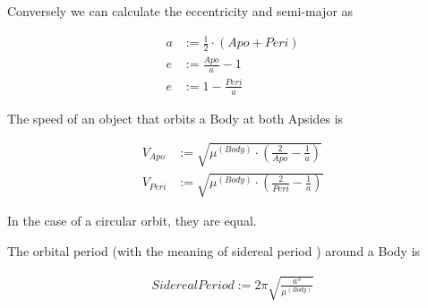 \documentclass[11pt]{article}
\begin{document}
Conversely we can calculate the eccentricity and semi-major as

\begin{align}
  a & := \frac{1}{2}\cdot(Apo + Peri)\\
  e & := \frac{Apo}{a} - 1\\
  e & := 1 - \frac{Peri}{a}
\end{align}

The speed of an object that orbits a Body at both Apsides is

\begin{align}
V_{Apo} & := \sqrt{\mu^{(Body)} \cdot \left(\frac{2}{Apo} - \frac{1}{a}\right)}\\
V_{Peri} & := \sqrt{\mu^{(Body)} \cdot\left(\frac{2}{Peri} - \frac{1}{a}\right)}
\end{align}

In the case of a circular orbit, they are equal.

The  orbital period (with the meaning of
 sidereal period \cite{SIDPER}) around a Body
is

\begin{align}
SiderealPeriod := 2\pi\sqrt{\frac{a^3}{\mu^{(Body)}}}
\end{align}



\printindex
\end{document}
